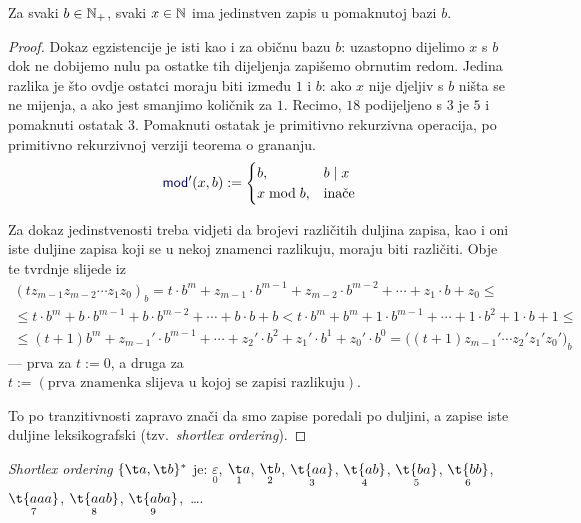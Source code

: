 \begin{lema}[{name=[egzistencija i jedinstvenost zapisa u pomaknutoj bazi]}]\label{lm:pomakbaza}
Za svaki $b\in{\mathbb N}_+$, svaki $x\in{\mathbb N}$ ima jedinstven zapis u pomaknutoj bazi $b$.
\end{lema}
\begin{proof}
Dokaz egzistencije je isti kao i za običnu bazu $b$: uzastopno dijelimo $x$ s $b$ dok ne dobijemo nulu pa ostatke tih dijeljenja zapišemo obrnutim redom. Jedina razlika je što ovdje ostatci moraju biti između $1$ i $b$: ako $x$ nije djeljiv s $b$ ništa se ne mijenja, a ako jest smanjimo količnik za $1$. Recimo, $18$ podijeljeno s $3$ je $5$ i pomaknuti ostatak $3$. Pomaknuti ostatak je primitivno rekurzivna operacija, po primitivno rekurzivnoj verziji teorema o grananju.
\begin{equation}
    \f{mod}'(x,b):=\begin{cases}
        b,&b\mid x\\
        x\bmod b,&\text{inače}
    \end{cases}
\end{equation}

Za dokaz jedinstvenosti treba vidjeti da brojevi različitih duljina zapisa, kao i oni iste duljine zapisa koji se u nekoj znamenci razlikuju, moraju biti različiti. Obje te tvrdnje slijede iz
\begin{multline}
\label{eq:injNSz}
	(tz_{m-1}z_{m-2}\dotsm z_1z_0)_b=
	t\cdot b^m+z_{m-1}\cdot b^{m-1}+z_{m-2}\cdot b^{m-2}+\dotsb
		+z_1\cdot b+z_0\le{}\\{}\le
	t\cdot b^m+b\cdot b^{m-1}+b\cdot b^{m-2}+\dotsb+b\cdot b+b<
	t\cdot b^m+b^m+1\cdot b^{m-1}+\dotsb+1\cdot b^2+1\cdot b+1
		\le{}\\{}\le
	(t+1)b^m+z_{m-1}'\cdot b^{m-1}+\dotsb
		+z_2'\cdot b^2+z_1'\cdot b^1+z_0'\cdot b^0=
        \bigl((t+1)z_{m-1}'\dotsm z_2'z_1'z_0'\bigr)_b
\end{multline}
	--- prva za $t:=0$, a druga za $t:=(\text{prva znamenka slijeva u kojoj se zapisi razlikuju})$. %

To po tranzitivnosti zapravo znači da smo zapise poredali po duljini, a zapise iste duljine leksikografski (tzv\!.\ \emph{shortlex ordering}).
\end{proof}

\begin{primjer}[{name=[\emph{shortlex ordering} riječi nad dvočlanom abecedom]}]
\emph{Shortlex ordering} $\{\t a,\t b\}^*$ je: $\underset{0}{\varepsilon}$,
$\underset{1}{\t a}$,
$\underset{2}{\t b}$,
$\underset{3}{\t{aa}}$,
$\underset{4}{\t{ab}}$,
$\underset{5}{\t{ba}}$,
$\underset{6}{\t{bb}}$,
$\underset{7}{\t{aaa}}$,
$\underset{8}{\t{aab}}$,
$\underset{9}{\t{aba}}$,~\ldots.
\end{primjer}

